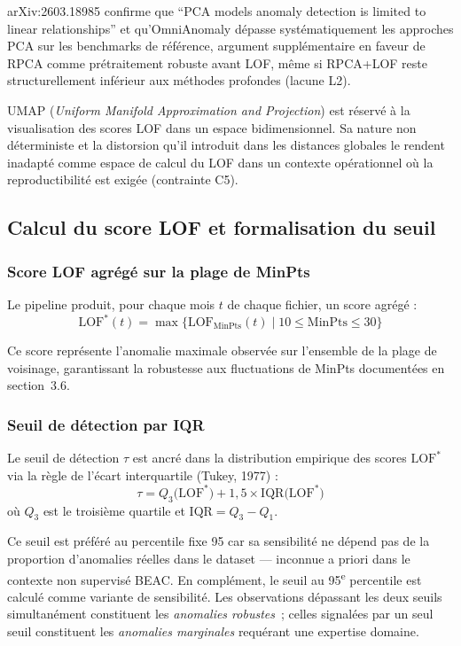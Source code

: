 \documentclass[12pt,a4paper]{article}
\begin{document}
arXiv:2603.18985 confirme que ``PCA models anomaly detection is limited to
linear relationships'' et qu'OmniAnomaly dépasse systématiquement les
approches PCA sur les benchmarks de référence, argument supplémentaire en
faveur de RPCA comme prétraitement robuste avant LOF, même si RPCA+LOF
reste structurellement inférieur aux méthodes profondes (lacune L2).

UMAP (\textit{Uniform Manifold Approximation and Projection}) est réservé à
la visualisation des scores LOF dans un espace bidimensionnel. Sa nature non
déterministe et la distorsion qu'il introduit dans les distances globales le
rendent inadapté comme espace de calcul du LOF dans un contexte opérationnel
où la reproductibilité est exigée (contrainte C5).

\subsection{Calcul du score LOF et formalisation du seuil}

\subsubsection{Score LOF agrégé sur la plage de MinPts}

Le pipeline produit, pour chaque mois $t$ de chaque fichier, un score agrégé :
$$\mathrm{LOF}^*(t) = \max \bigl\{
\mathrm{LOF}_{\mathrm{MinPts}}(t) \mid
10 \leq \mathrm{MinPts} \leq 30
\bigr\}$$

Ce score représente l'anomalie maximale observée sur l'ensemble de la plage
de voisinage, garantissant la robustesse aux fluctuations de MinPts
documentées en section~3.6.

\subsubsection{Seuil de détection par IQR}

Le seuil de détection $\tau$ est ancré dans la distribution empirique des
scores $\mathrm{LOF}^*$ via la règle de l'écart interquartile (Tukey, 1977) :
$$\tau = Q_3\!\bigl(\mathrm{LOF}^*\bigr)
+ 1{,}5 \times \mathrm{IQR}\!\bigl(\mathrm{LOF}^*\bigr)$$
où $Q_3$ est le troisième quartile et $\mathrm{IQR} = Q_3 - Q_1$.

Ce seuil est préféré au percentile fixe 95 car sa sensibilité ne dépend pas
de la proportion d'anomalies réelles dans le dataset --- inconnue a priori
dans le contexte non supervisé BEAC. En complément, le seuil au
95\textsuperscript{e} percentile est calculé comme variante de sensibilité.
Les observations dépassant les deux seuils simultanément constituent les
\textit{anomalies robustes}~; celles signalées par un seul seuil constituent
les \textit{anomalies marginales} requérant une expertise domaine.
\end{document}

